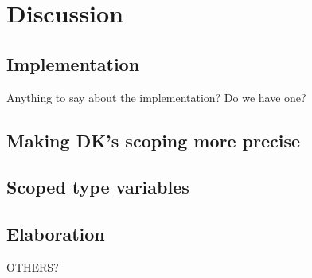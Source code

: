 \section{Discussion}


\subsection{Implementation}
Anything to say about the implementation? Do we have one?

\subsection{Making DK's scoping more precise}

\subsection{Scoped type variables}

\subsection{Elaboration}

OTHERS?